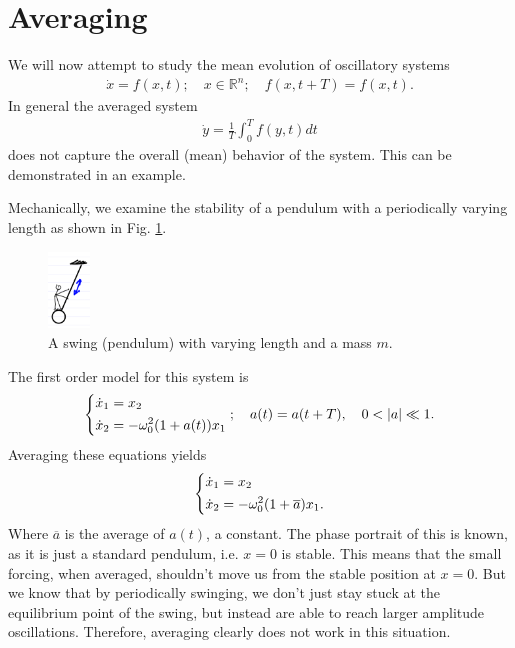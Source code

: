 \section{Averaging}
We will now attempt to study the mean evolution of oscillatory systems
\begin{align}
	\dot{x} = f(x,t);\quad x \in \mathbb{R}^{n};\quad f(x,t+T) = f(x,t).
\end{align}
In general the averaged system
\begin{align}
	\dot{y} = \frac{1}{T} \int_{0}^{T} f(y,t)dt	
\end{align}
does not capture the overall (mean) behavior of the system. This can be demonstrated in an example.
\begin{ex}
	Mechanically, we examine the stability of a pendulum with a periodically varying length as shown in Fig. \ref{fig:swing_drawing}.
	\begin{figure}[h!]
		\centering
		\includegraphics[width=0.1\textwidth]{figures/ch5/2swing_drawing.png}
		\caption{A swing (pendulum) with varying length and a mass $m$.}
		\label{fig:swing_drawing}
	\end{figure}
	The first order model for this system is
	\begin{align}
		\begin{dcases}
			\dot{x}_1 = x_2\\
			\dot{x}_2 = -\omega_0^2 (1+a(t))x_1
		\end{dcases}
		;\quad a(t) = a(t+T),\quad 0<|a|\ll 1.	
	\end{align}
Averaging these equations yields
\begin{align}
	\begin{dcases}
		\dot{x}_1 = x_2 \\
		\dot{x}_2 = -\omega_0^2(1+ \overline{a})x_1.
	\end{dcases}
\end{align}
Where $\overline{a}$ is the average of $a(t)$, a constant. The phase portrait of this is known, as it is just a standard pendulum, i.e. $x=0$ is stable. This means that the small forcing, when averaged, shouldn't move us from the stable position at $x=0$. But we know that by periodically swinging, we don't just stay stuck at the equilibrium point of the swing, but instead are able to reach larger amplitude oscillations. Therefore, averaging clearly does not work in this situation. 
\end{ex}

